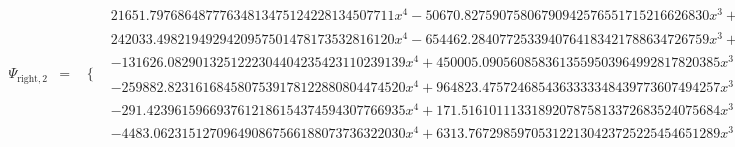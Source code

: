 \documentclass{article}
\begin{document}
\begin{landscape}
\begin{eqnarray*}
\begin{array}{cc}
\end{array}\\
\Psi_{\text{right},2} & = & \begin{array}{cc}
 \{ & 
\begin{array}{cc}
 21651.79768648777634813475124228134507711 x^4-50670.82759075806790942576551715216626830 x^3+44354.17829778064499279452262325912273667 x^2-17207.75631107201358764018010279990354007 x+2495.770257534102925429932479497702158677 & x\geq \frac{1}{2}\land x<\frac{5}{8} \\
 242033.4982194929420957501478173532816120 x^4-654462.2840772533940764183421788634726759 x^3+662313.9532145193109104865745827574475201 x^2-297305.8663136464928082164799945735603453 x+49948.99667188368762052294966456474020584 & x\geq \frac{5}{8}\land x<\frac{3}{4} \\
 -131626.0829013251222304404235423110239139 x^4+450005.0905608583613559503964992817820385 x^3-574770.8851484847632101308620509641839875 x^2+325083.2396704265146310340176060722851604 x-68701.55807342583242338944159002497136277 & x\geq \frac{3}{4}\land x<\frac{7}{8} \\
 -259882.8231616845807539178122880804474520 x^4+964823.4757246854363333348439773607494257 x^3-1.342573171262653697035779109300825112710\times 10^6 x^2+829951.7456134888224993693626467952843440 x-192319.2269138359810430072850352504736081 & x\geq \frac{7}{8}\land x<1 \\
 -291.4239615966937612186154374594307766935 x^4+171.5161011133189207875813372683524075684 x^3-22.58989393116094256055604638687253774301 x^2 & x\geq 0\land x<\frac{1}{4} \\
 -4483.062315127096490867566188073736322030 x^4+6313.767298597053122130423725225454651289 x^3-3247.209060204284971165278294248913901077 x^2+722.6148807040120221536375981024581075528 x-58.71410992613796498390495747647953320150 & x\geq \frac{1}{4}\land x<\frac{1}{2}
\end{array}

\end{array}\end{eqnarray*}
\end{landscape}
\end{document}
